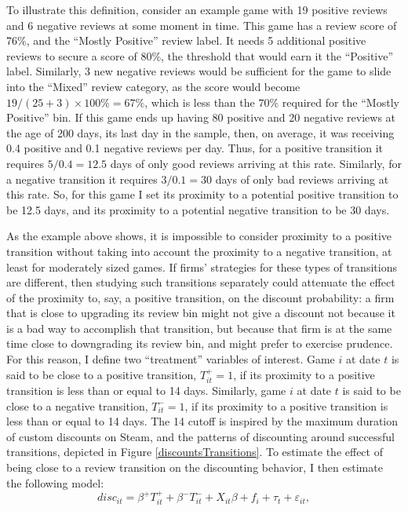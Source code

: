 \documentclass[12pt,pagebackref]{article}
\begin{document}
To illustrate this definition, consider an example game with 19 positive
reviews and 6 negative reviews at some moment in time. This game has a
review score of 76\%, and the ``Mostly Positive'' review label. It needs
5 additional positive reviews to secure a score of 80\%, the threshold
that would earn it the ``Positive'' label. Similarly, 3 new negative
reviews would be sufficient for the game to slide into the ``Mixed''
review category, as the score would become
\(19/(25 + 3) \times 100\%= 67\%\), which is less than the \(70\%\)
required for the ``Mostly Positive'' bin. If this game ends up having 80
positive and 20 negative reviews at the age of 200 days, its last day in
the sample, then, on average, it was receiving 0.4 positive and 0.1
negative reviews per day. Thus, for a positive transition it requires
\(5/0.4 = 12.5\) days of only good reviews arriving at this rate.
Similarly, for a negative transition it requires \(3 / 0.1 = 30\) days
of only bad reviews arriving at this rate. So, for this game I set its
proximity to a potential positive transition to be 12.5 days, and its
proximity to a potential negative transition to be 30 days.

As the example above shows, it is impossible to consider proximity to a
positive transition without taking into account the proximity to a
negative transition, at least for moderately sized games. If firms'
strategies for these types of transitions are different, then studying
such transitions separately could attenuate the effect of the proximity
to, say, a positive transition, on the discount probability: a firm that
is close to upgrading its review bin might not give a discount not
because it is a bad way to accomplish that transition, but because that
firm is at the same time close to downgrading its review bin, and might
prefer to exercise prudence. For this reason, I define two ``treatment''
variables of interest. Game \(i\) at date \(t\) is said to be close to a
positive transition, \(T_{it}^+ = 1\), if its proximity to a positive
transition is less than or equal to 14 days. Similarly, game \(i\) at
date \(t\) is said to be close to a negative transition,
\(T_{it}^- = 1\), if its proximity to a positive transition is less than
or equal to 14 days. The 14 cutoff is inspired by the maximum duration
of custom discounts on Steam, and the patterns of discounting around
successful transitions, depicted in Figure \ref{discountsTransitions}.
To estimate the effect of being close to a review transition on the
discounting behavior, I then estimate the following model:
\begin{equation}\label{potTransitionsReg}
disc_{it} = \beta^+ T_{it}^+ + \beta^- T_{it}^- + X_{it}\beta + f_i + \tau_t + \varepsilon_{it},
\end{equation}
\end{document}
